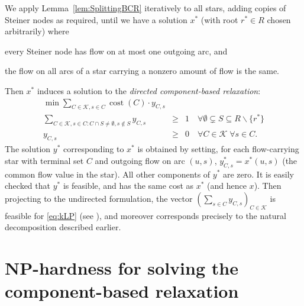 \documentclass[11pt, letterpaper]{article}
\theoremstyle{definition}
\DeclareMathOperator{\cost}{cost}
\begin{document}
We apply Lemma~\ref{lem:SplittingBCR} iteratively to all stars, adding copies of Steiner nodes as required, until we have a solution $x^*$ (with root $r^* \in R$ chosen arbitrarily) where \begin{inparaenum}[(i)] \item every Steiner node has flow on at most one outgoing arc, and \item the flow on all arcs of a star carrying a nonzero amount of flow is the same. \end{inparaenum}
Then $x^*$ induces a solution to the
\emph{directed component-based relaxation}: \begin{eqnarray*}
  \min \sum_{C \in \mathcal{K}, s \in C} \cost(C) \cdot y_{C,s} & &   \\
  \sum_{C \in \mathcal{K},s \in C:  C \cap S \neq \emptyset, s \notin S} y_{C,s} &\geq& 1 \quad \forall \emptyset \subsetneq S\subseteq R\backslash\{r^*\} \\
 y_{C,s} &\geq& 0 \quad \forall C \in \mathcal{K} \; \forall s\in C.  \end{eqnarray*}
The solution $y^*$ corresponding to $x^*$ is obtained by setting, for each flow-carrying star with terminal set $C$ and outgoing flow on arc $(u,s)$, $y^*_{C,s} = x^*(u,s)$ (the common flow value in the star).
All other components of $y^*$ are zero.
It is easily checked that $y^*$ is feasible, and has the same cost as $x^*$ (and hence $x$).
Then projecting to the undirected formulation, the vector $(\sum_{s \in C} y_{C,s})_{C \in \mathcal{K}}$ is feasible for \eqref{eq:kLP} (see \cite{PV03}), and moreover corresponds precisely to the natural decomposition described earlier.


\section{$\mathbf{NP}$-hardness for solving the component-based relaxation}\label{appendix:nphardness}
\end{document}
